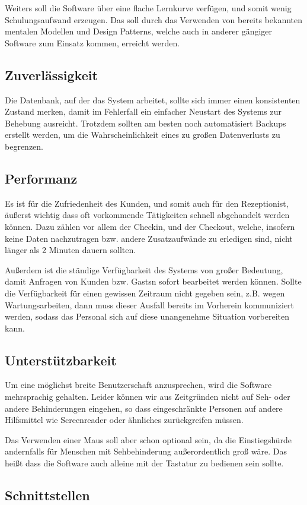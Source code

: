 \documentclass[10pt,a4paper,titlepage]{article}
\begin{document}
Weiters soll die Software über eine flache Lernkurve verfügen, und somit wenig Schulungsaufwand erzeugen. Das soll durch das Verwenden von bereits bekannten mentalen Modellen und Design Patterns, welche auch in anderer gängiger Software zum Einsatz kommen, erreicht werden.
\subsection{Zuverlässigkeit}
Die Datenbank, auf der das System arbeitet, sollte sich immer einen konsistenten Zustand merken, damit im Fehlerfall ein einfacher Neustart des Systems zur Behebung ausreicht. Trotzdem sollten am besten noch automatisiert Backups erstellt werden, um die Wahrscheinlichkeit eines zu großen Datenverlusts zu begrenzen.
\subsection{Performanz}
Es ist für die Zufriedenheit des \Gls{Kunde}n, und somit auch für den \Gls{Rezeptionist}, äußerst wichtig dass oft vorkommende Tätigkeiten schnell abgehandelt werden können. Dazu zählen vor allem der \Gls{Checkin}, und der \Gls{Checkout}, welche, insofern keine Daten nachzutragen bzw. andere Zusatzaufwände zu erledigen sind, nicht länger als 2 Minuten dauern sollten.

Außerdem ist die ständige Verfügbarkeit des Systems von großer Bedeutung, damit Anfragen von \Gls{Kunde}n bzw. \Glspl{Gast}n sofort bearbeitet werden können. Sollte die Verfügbarkeit für einen gewissen Zeitraum nicht gegeben sein, z.B. wegen Wartungsarbeiten, dann muss dieser Ausfall bereits im Vorherein kommuniziert werden, sodass das Personal sich auf diese unangenehme Situation vorbereiten kann.
\subsection{Unterstützbarkeit}
Um eine möglichst breite Benutzerschaft anzusprechen, wird die Software mehrsprachig gehalten. Leider können wir aus Zeitgründen nicht auf Seh- oder andere Behinderungen eingehen, so dass eingeschränkte Personen auf andere Hilfsmittel wie Screenreader oder ähnliches zurückgreifen müssen.

Das Verwenden einer Maus soll aber schon optional sein, da die Einstiegshürde andernfalls für Menschen mit Sehbehinderung außerordentlich groß wäre. Das heißt dass die Software auch alleine mit der Tastatur zu bedienen sein sollte.
\subsection{Schnittstellen}
\end{document}
